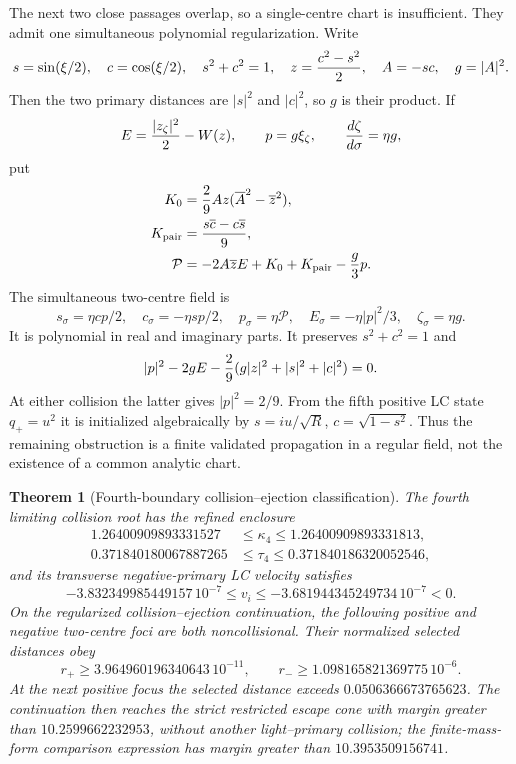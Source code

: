 \documentclass[11pt]{article}
\newtheorem{theorem}{Theorem}
\begin{document}
The next two close passages overlap, so a single-centre chart is insufficient.
They admit one simultaneous polynomial regularization.  Write
\[
 s=\sin(\xi/2),\quad c=\cos(\xi/2),\quad s^2+c^2=1,
 \quad z={c^2-s^2\over2},\quad A=-sc,\quad g=|A|^2.
\]
Then the two primary distances are $|s|^2$ and $|c|^2$, so $g$ is their
product.  If
\[
 E={|z_\zeta|^2\over2}-W(z),\qquad p=g\xi_\zeta,\qquad
 {d\zeta\over d\sigma}=\eta g,
\]
put
\[
 \begin{aligned}
 K_0&={2\over9}Az(\overline A^2-\overline z^2),\\
 K_{\mathrm{pair}}&={s\overline c-c\overline s\over9},\\
 \mathcal P&=-2A\overline zE+K_0+K_{\mathrm{pair}}-{g\over3}p.
 \end{aligned}
\]
The simultaneous two-centre field is
\[
 s_\sigma=\eta cp/2,\quad c_\sigma=-\eta sp/2,\quad
 p_\sigma=\eta\mathcal P,\quad E_\sigma=-\eta|p|^2/3,\quad
 \zeta_\sigma=\eta g.
\]
It is polynomial in real and imaginary parts.  It preserves $s^2+c^2=1$
and
\[
 |p|^2-2gE-{2\over9}(g|z|^2+|s|^2+|c|^2)=0.
\]
At either collision the latter gives $|p|^2=2/9$.  From the fifth positive LC
state $q_+=u^2$ it is initialized algebraically by
$s=iu/\sqrt R$, $c=\sqrt{1-s^2}$.  Thus the remaining obstruction is a
finite validated propagation in a regular field, not the existence of a
common analytic chart.

\begin{theorem}[Fourth-boundary collision--ejection classification]
The fourth limiting collision root has the refined enclosure
\[
 \begin{aligned}
 1.26400909893331527&\leq\kappa_4
          \leq1.26400909893331813,\\
 0.371840180067887265&\leq\tau_4
          \leq0.371840186320052546,
 \end{aligned}
\]
and its transverse negative-primary LC velocity satisfies
\[
 -3.832349985449157\,10^{-7}
 \leq v_i\leq
 -3.681944345249734\,10^{-7}<0.                         \tag{38}
\]
On the regularized collision--ejection continuation, the following positive
and negative two-centre foci are both noncollisional.  Their normalized
selected distances obey
\[
 r_+\geq3.964960196340643\,10^{-11},
 \qquad r_-\geq1.098165821369775\,10^{-6}.              \tag{39}
\]
At the next positive focus the selected distance exceeds
$0.0506366673765623$.  The continuation then reaches the strict restricted
escape cone with margin greater than $10.2599662232953$, without another
light--primary collision; the finite-mass-form comparison expression has
margin greater than $10.3953509156741$.
\end{theorem}
\end{document}
